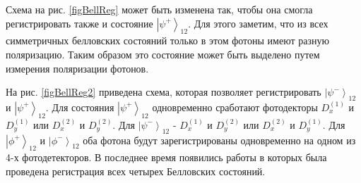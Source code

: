 

Схема на рис. \ref{figBellReg} может быть изменена так, чтобы она
смогла регистрировать также и состояние
$\left|\psi^{+}\right>_{12}$. Для этого заметим, что из всех
симметричных белловских состояний только в этом фотоны имеют разную
поляризацию. Таким образом это состояние может быть выделено путем
измерения поляризации фотонов.

На рис. \ref{figBellReg2} приведена схема, которая позволяет
регистрировать $\left|\psi^{-}\right>_{12}$ и
$\left|\psi^{+}\right>_{12}$. Для состояния
$\left|\psi^{+}\right>_{12}$ одновременно сработают фотодекторы 
$D^{(1)}_x$ и $D^{(1)}_y$ или $D^{(2)}_x$ и $D^{(2)}_y$. Для
$\left|\psi^{-}\right>_{12}$ - $D^{(1)}_x$ и $D^{(2)}_y$ или
$D^{(2)}_x$ и $D^{(1)}_y$. Для $\left|\phi^{+}\right>_{12}$ и
$\left|\phi^{-}\right>_{12}$ оба фотона будут зарегистрированы
одновременно на одном из 4-х фотодетекторов. В последнее время
появились работы \cite{bKulik} в которых была проведена регистрация
всех четырех Белловских состояний.
